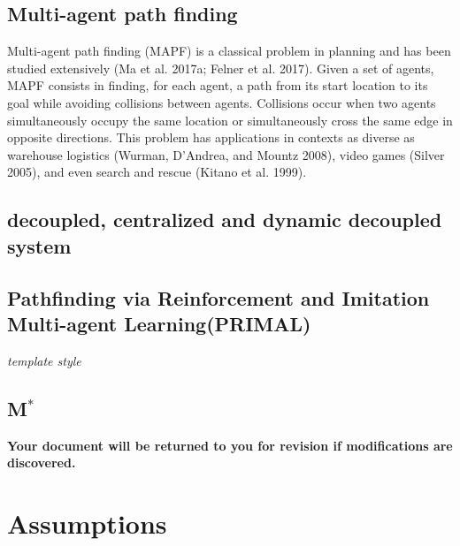 \documentclass[sigconf,authordraft, nonacm=true]{acmart}
\begin{document}
\subsection{Multi-agent path finding}
Multi-agent path finding (MAPF) is a classical problem in planning and has been studied extensively (Ma et al. 2017a; Felner et al. 2017). Given a set of agents, MAPF consists in finding, for each agent, a path from its start location to its goal while avoiding collisions between agents. Collisions occur when two agents simultaneously occupy the same location or simultaneously cross the same edge in opposite directions. This problem has applications in contexts as diverse as warehouse logistics (Wurman, D’Andrea, and Mountz 2008), video games (Silver 2005), and even search and rescue (Kitano et al. 1999). 

\subsection{decoupled, centralized and dynamic decoupled system}


\subsection{Pathfinding via Reinforcement and Imitation Multi-agent Learning(PRIMAL)}

{\itshape template style}



\subsection{M$^*$}


{\bfseries Your document will be returned to you for revision if
  modifications are discovered.}

\section{Assumptions}
\end{document}
